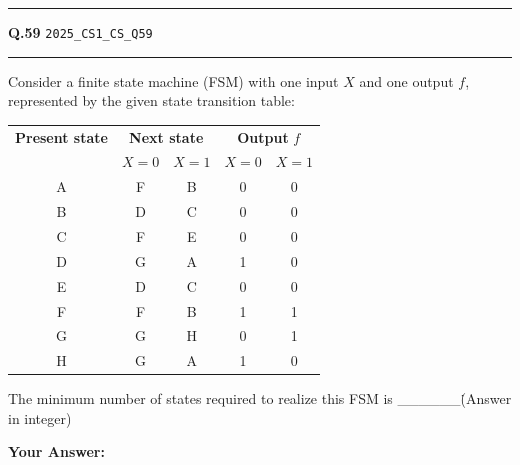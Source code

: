 \documentclass[a4paper,10pt]{article}
\begin{document}
\vspace{6pt}\hrule height 0.35pt\vspace{6pt}
\noindent
\begin{tcolorbox}[
    blanker,
    sidebyside,
    sidebyside align=top,
    lefthand width=0.55\textwidth,
    top=4pt, bottom=4pt, left=0pt, right=0pt,
    middle=16pt,
    underlay={
        \draw[dashed, black!80, line width=0.8pt, dash pattern=on 4pt off 3pt]
            ([xshift=0.55\textwidth+8pt]frame.north west) --
            ([xshift=0.55\textwidth+8pt]frame.south west);
    }
]
\textbf{Q.59}  \hfill {\tiny\texttt{2025\_CS1\_CS\_Q59}}
\vspace{2pt}\hrule height 0.3pt\vspace{4pt}

Consider a finite state machine (FSM) with one input $X$ and one output $f$, represented by the given state transition table:
\par\medskip
\begin{tabular}{|c|cc|cc|}
\hline
\textbf{Present state} & \multicolumn{2}{c|}{\textbf{Next state}} & \multicolumn{2}{c|}{\textbf{Output } $f$} \\
& $X=0$ & $X=1$ & $X=0$ & $X=1$ \\
\hline
A & F & B & 0 & 0 \\
B & D & C & 0 & 0 \\
C & F & E & 0 & 0 \\
D & G & A & 1 & 0 \\
E & D & C & 0 & 0 \\
F & F & B & 1 & 1 \\
G & G & H & 0 & 1 \\
H & G & A & 1 & 0 \\
\hline
\end{tabular}
\par\medskip
The minimum number of states required to realize this FSM is \_\_\_\_\_\_\. (Answer in integer)

\par\vspace{6pt}\noindent\textbf{Your Answer:} \fbox{\rule{0pt}{1.3ex}\hspace{3cm}}

\tcblower


\end{tcolorbox}
\end{document}
